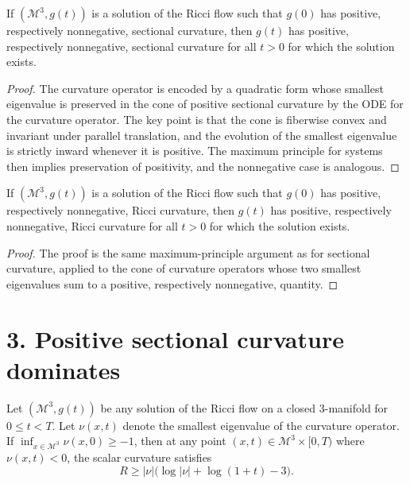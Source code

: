 \begin{lemma}
\label{ch09-lem-positive-sectional-curvature-preserved}
If \((\mathcal M^3,g(t))\) is a solution of the Ricci flow such that \(g(0)\) has positive, respectively nonnegative, sectional curvature, then \(g(t)\) has positive, respectively nonnegative, sectional curvature for all \(t>0\) for which the solution exists.
\end{lemma}

\begin{proof}
\sketch The curvature operator is encoded by a quadratic form whose smallest eigenvalue is preserved in the cone of positive sectional curvature by the ODE for the curvature operator. The key point is that the cone is fiberwise convex and invariant under parallel translation, and the evolution of the smallest eigenvalue is strictly inward whenever it is positive. The maximum principle for systems then implies preservation of positivity, and the nonnegative case is analogous.
\end{proof}

\begin{lemma}
\label{ch09-lem-positive-ricci-curvature-preserved}
If \((\mathcal M^3,g(t))\) is a solution of the Ricci flow such that \(g(0)\) has positive, respectively nonnegative, Ricci curvature, then \(g(t)\) has positive, respectively nonnegative, Ricci curvature for all \(t>0\) for which the solution exists.
\end{lemma}

\begin{proof}
\sketch The proof is the same maximum-principle argument as for sectional curvature, applied to the cone of curvature operators whose two smallest eigenvalues sum to a positive, respectively nonnegative, quantity.
\end{proof}

\section*{3. Positive sectional curvature dominates}

\begin{theorem}
\label{ch09-thm-pinching-estimate}
Let \((\mathcal M^3,g(t))\) be any solution of the Ricci flow on a closed \(3\)-manifold for \(0\le t<T\). Let \(\nu(x,t)\) denote the smallest eigenvalue of the curvature operator. If \(\inf_{x\in\mathcal M^3}\nu(x,0)\ge -1\), then at any point \((x,t)\in\mathcal M^3\times[0,T)\) where \(\nu(x,t)<0\), the scalar curvature satisfies
\[
R\ge |\nu|\bigl(\log |\nu|+\log(1+t)-3\bigr).
\]
\end{theorem}

